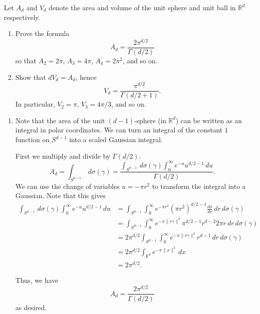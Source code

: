 \documentclass[12 pt, letterpaper]{hmcpset}
\begin{document}
\begin{problem}[S \& S \S 6.6 \#4]
	Let $A_{d}$ and $V_{d}$ denote the area and volume of the unit sphere and unit ball in $\mathbb{R}^{d}$ respectively.
	\begin{enumerate}
		\item Prove the formula
			\[
				A_{d} = \frac{2 \pi^{d / 2}}{\Gamma(d / 2)}
			\]
			so that $A_{2} = 2 \pi$, $A_{3} = 4 \pi$, $A_{4} = 2 \pi^{2}$, and so on.

		\item Show that $d V_{d} = A_{d}$, hence
	\[
		V_{d} = \frac{\pi^{d / 2}}{\Gamma(d / 2 + 1)}.
	\]
	In particular, $V_{2} = \pi$, $V_{3} = 4 \pi / 3$, and so on.
	\end{enumerate}
\end{problem}

\begin{solution}
	\begin{enumerate}
		\item Note that the area of the unit $(d - 1)$-sphere (in $\mathbb{R}^{d}$) can be written as an integral in polar coordinates. We can turn an integral of the constant $1$ function on $S^{d - 1}$ into a scaled Gaussian integral.

			First we multiply and divide by $\Gamma(d / 2)$. 
			\[
				A_{d} = \int_{S^{d - 1}} \, d\sigma(\gamma) = \frac{\displaystyle \int_{S^{d - 1}} \, d\sigma(\gamma) \int_{0}^{\infty} e^{-u} u^{d/2 - 1} \, du }{\Gamma(d / 2)}.
			\]
			We can use the change of variables $u = - \pi r^{2}$ to transform the integral into a Gaussian. Note that this gives
			\begin{align*}
				\int_{S^{d - 1}}  \, d\sigma(\gamma) \int_{0}^{\infty} e^{-u} u^{d / 2 - 1} \, du & = \int_{S^{d - 1}} \int_{0}^{\infty} e^{- \pi r^{2}} (\pi r^{2})^{d / 2 - 1} \frac{d x}{d r} \, dr  \, d\sigma(\gamma) \\
														  & = \int_{S^{d - 1}} \int_{0}^{\infty} e^{-\pi \lVert r \gamma \rVert^{2}} \pi^{d / 2 - 1} r^{d - 2} 2 \pi r \, dr  \, d\sigma(\gamma) \\
														  & = 2 \pi^{d / 2} \int_{S^{d - 1}} \int_{0}^{\infty} e^{-\pi \lVert r \gamma \rVert^{2}} r^{d - 1} \, dr  \, d\sigma(\gamma) \\
														  & = 2 \pi^{d / 2} \int_{\mathbb{R}^{d}} e^{-\pi \lVert x \rVert^{2}} \, dx \\
														  & = 2 \pi^{d / 2}.
			\end{align*}

			Thus, we have
			\[
				A_{d} = \frac{2 \pi^{d / 2}}{\Gamma(d / 2)}
			\]
			as desired.


\end{enumerate}
\end{solution}
\end{document}
